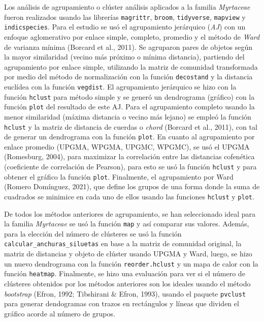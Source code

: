 \documentclass[11pt,]{article}
\begin{document}
Los análisis de agrupamiento o clúster análisis aplicados a la familia
\emph{Myrtaceae} fueron realizados usando las librerías
\texttt{magrittr}, \texttt{broom}, \texttt{tidyverse}, \texttt{mapview}
y \texttt{indicspecies}. Para el estudio se usó el agrupamiento
jerárquico (\emph{AJ}) con un enfoque aglomerativo por enlace simple,
completo, promedio y el método de \emph{Ward} de varianza mínima
(Borcard et al., 2011). Se agruparon pares de objetos según la mayor
similaridad (vecino más próximo o mínima distancia), partiendo del
agrupamiento por enlace simple, utilizando la matriz de comunidad
transformada por medio del método de normalización con la función
\texttt{decostand} y la distancia euclídea con la función
\texttt{vegdist}. El agrupamiento jerárquico se hizo con la función
\texttt{hclust} para método simple y se generó un dendrograma (gráfico)
con la función \texttt{plot} del resultado de este AJ. Para el
agrupamiento completo usando la menor similaridad (máxima distancia o
vecino más lejano) se empleó la función \texttt{hclust} y la matriz de
distancia de cuerdas o \emph{chord} (Borcard et al., 2011), con tal de
generar un dendrograma con la función \texttt{plot}. En cuanto al
agrupamiento por enlace promedio (UPGMA, WPGMA, UPGMC, WPGMC), se usó el
UPGMA (Romesburg, 2004), para maximizar la correlación entre las
distancias cofenética (coeficiente de correlación de Pearson), para esto
se usó la función \texttt{hclust} y para obtener el gráfico la función
\texttt{plot}. Finalmente, el agrupamiento por Ward (Romero Domínguez,
2021), que define los grupos de una forma donde la suma de cuadrados se
minimice en cada uno de ellos usando las funciones \texttt{hclust} y
\texttt{plot}.

De todos los métodos anteriores de agrupamiento, se han seleccionado
ideal para la familia \emph{Myrtaceae} se usó la función \texttt{map} y
así comparar sus valores. Además, para la elección del número de
clústeres se usó la función \texttt{calcular\_anchuras\_siluetas} en
base a la matriz de comunidad original, la matriz de distancias y objeto
de clúster usando UPGMA y Ward, luego, se hizo un nuevo dendrograma con
la función \texttt{reorder.hclust} y un mapa de calor con la función
\texttt{heatmap}. Finalmente, se hizo una evaluación para ver si el
número de clústeres obtenidos por los métodos anteriores son los ideales
usando el método \emph{bootstrap} (Efron, 1992; Tibshirani \& Efron,
1993), usando el paquete \texttt{pvclust} para generar dendogramas con
trazos en rectángulos y líneas que dividen el gráfico acorde al número
de grupos.
\end{document}
